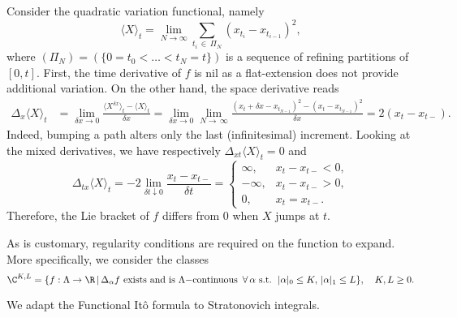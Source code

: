 \begin{example}\label{ex:QV} Consider the quadratic variation functional, namely
$$\langle X \rangle_t =  \lim_{N \to \infty} \sum_{t_i\, \in \, \Pi_{N}} (x_{t_i}-x_{t_{i-1}})^2,$$
where $(\Pi_N) = (\{0 = t_0 < \ldots < t_N = t\})$ is a sequence of refining partitions of $[0,t]$.
First, the time derivative of $f$ is nil as a flat-extension  does not provide additional variation. On the other hand, the space derivative reads
\begin{align*}
    \Delta_x \langle X \rangle_t &= \lim_{\delta x \to 0} \frac{\langle X^{\delta x} \rangle_t-\langle X \rangle_t}{\delta x} = \lim_{\delta x \to 0} \lim_{N \to \,\infty} \frac{(x_t + \delta x - x_{t_{N-1}})^2 - (x_t - x_{t_{N-1}})^2}{\delta x} = 2(x_t-x_{t-}).
\end{align*}
Indeed, bumping a path alters only  the last (infinitesimal)   increment. %
Looking at the mixed derivatives, we have respectively $\Delta_{xt}\langle X \rangle_t = 0 $ and 
$$\Delta_{tx}\langle X \rangle_t = -2\lim_{\delta t \downarrow 0} \frac{x_{t} - x_{t-}}{\delta t} =   \begin{cases} \infty, & x_{t} - x_{t-} < 0, \\
- \infty, & x_{t} - x_{t-} > 0,\\
 0, & x_{t} = x_{t-}.
 \end{cases}
$$
Therefore, the Lie bracket of $f$ differs from $0$ when $X$ jumps at $t$.
\end{example}



As is customary,  regularity conditions are required on the function to expand. More specifically, we consider the classes 
$$\C^{K,L} = \{f:\Lambda \to \R \, |\, \Delta_{\alpha}f \text{ exists and is $\Lambda-$continuous } \, \forall \, 
\alpha \text{ s.t. }\, |\alpha|_0 \le K, \,  |\alpha|_1 \le L\}, \quad K,L \ge 0.$$ 

We adapt the Functional It\^o formula  \cite{Dupire} to Stratonovich integrals. %

